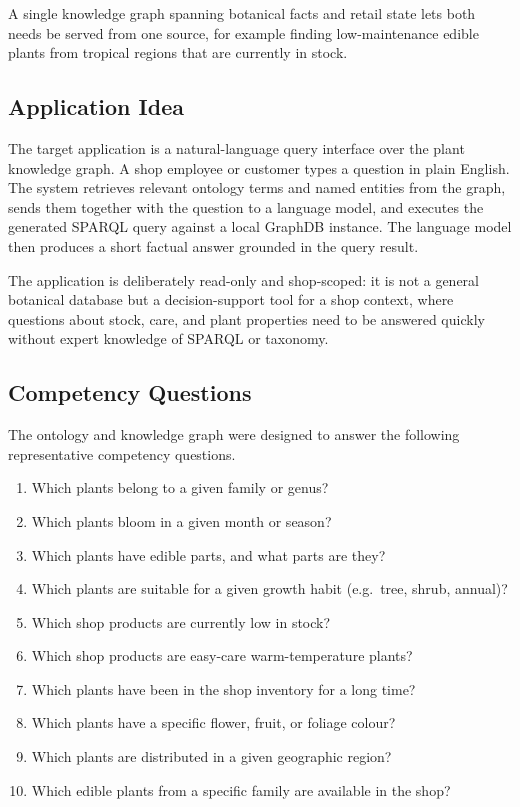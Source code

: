 \documentclass[11pt,a4paper]{article}
\begin{document}
A single knowledge graph spanning botanical facts and retail state lets both
needs be served from one source, for example finding low-maintenance edible
plants from tropical regions that are currently in stock.

\subsection{Application Idea}

The target application is a natural-language query interface over the
plant knowledge graph.
A shop employee or customer types a question in plain English.
The system retrieves relevant ontology terms and named entities from the graph,
sends them together with the question to a language model, and executes the
generated SPARQL query against a local GraphDB instance.
The language model then produces a short factual answer grounded in the query
result.

The application is deliberately read-only and shop-scoped: it is not a general
botanical database but a decision-support tool for a shop context, where
questions about stock, care, and plant properties need to be answered quickly
without expert knowledge of SPARQL or taxonomy.

\subsection{Competency Questions}

The ontology and knowledge graph were designed to answer the following
representative competency questions.

\begin{enumerate}
  \item Which plants belong to a given family or genus?
  \item Which plants bloom in a given month or season?
  \item Which plants have edible parts, and what parts are they?
  \item Which plants are suitable for a given growth habit
        (e.g.\ tree, shrub, annual)?
  \item Which shop products are currently low in stock?
  \item Which shop products are easy-care warm-temperature plants?
  \item Which plants have been in the shop inventory for a long time?
  \item Which plants have a specific flower, fruit, or foliage colour?
  \item Which plants are distributed in a given geographic region?
  \item Which edible plants from a specific family are available in the shop?
\end{enumerate}
\end{document}
